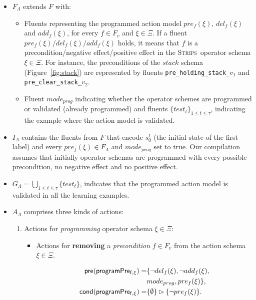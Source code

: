 \documentclass{article}
\newcommand{\pre}{\mathsf{pre}}     %
\newcommand{\cond}{\mathsf{cond}}   %
\newcommand{\strips}{\textsc{Strips}}     %
\begin{document}
\begin{itemize}
\item $F_{\Lambda}$ extends $F$ with:
\begin{itemize}
\item Fluents representing the programmed action model $pre_f(\xi)$, $del_f(\xi)$ and $add_f(\xi)$, for every $f\in F_v$ and $\xi \in \Xi$. If a fluent $pre_f(\xi)/del_f(\xi)/add_f(\xi)$ holds, it means that $f$ is a precondition/negative effect/positive effect in the \strips\ operator schema $\xi\in \Xi$. For instance, the preconditions of the $stack$ schema (Figure~\ref{fig:stack}) are represented by fluents {\small\tt pre\_holding\_stack\_$v_1$} and {\small\tt pre\_clear\_stack\_$v_2$}.
\item Fluent $mode_{prog}$ indicating whether the operator schemes are programmed or validated (already programmed) and fluents $\{test_t\}_{1\leq t\leq \tau}$, indicating the example where the action model is validated.
\end{itemize}
\item $I_{\Lambda}$ contains the fluents from $F$ that encode $s_0^1$ (the initial state of the first label) and every $pre_f(\xi)\in F_{\Lambda}$ and $mode_{prog}$ set to true. Our compilation assumes that initially operator schemas are programmed with every possible precondition, no negative effect and no positive effect.
\item $G_{\Lambda}=\bigcup_{1\leq t\leq \tau}\{test_t\}$, indicates that the programmed action model is validated in all the learning examples.
\item $A_{\Lambda}$ comprises three kinds of actions:
\begin{enumerate}
\item Actions for {\em programming} operator schema $\xi\in\Xi$:
\begin{itemize}
\item Actions for {\bf removing} a {\em precondition} $f\in F_v$ from the action schema $\xi\in\Xi$.

\begin{small}
\begin{align*}
\hspace*{7pt}\pre(\mathsf{programPre_{f,\xi}})=&\{\neg del_{f}(\xi),\neg add_{f}(\xi),\\
& mode_{prog}, pre_{f}(\xi)\},\\
\cond(\mathsf{programPre_{f,\xi}})=&\{\emptyset\}\rhd\{\neg pre_{f}(\xi)\}.
\end{align*}
\end{small}


\end{itemize}
\end{enumerate}
\end{itemize}
\end{document}

